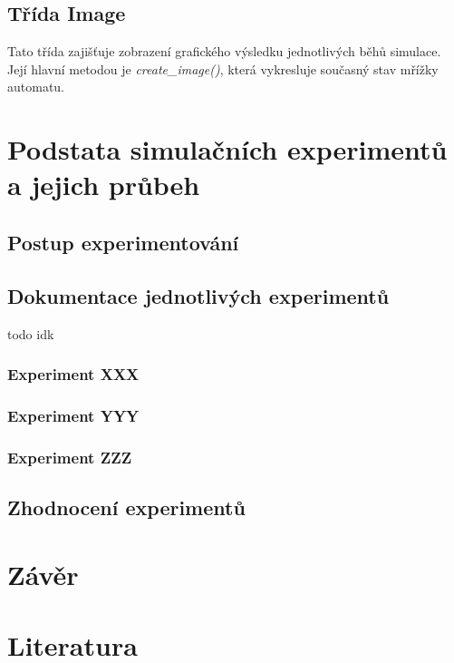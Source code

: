 \documentclass[a4paper,11pt]{article}
\begin{document}
\subsection{Třída Image}
Tato třída zajišťuje zobrazení grafického výsledku jednotlivých běhů simulace. Její hlavní metodou je \emph{create\_image()}, která vykresluje současný stav mřížky automatu.


\section{Podstata simulačních experimentů a jejich průbeh}
\subsection{Postup experimentování}
\subsection{Dokumentace jednotlivých experimentů}
todo idk
\subsubsection{Experiment XXX}
\subsubsection{Experiment YYY}
\subsubsection{Experiment ZZZ}
\subsection{Zhodnocení experimentů}

\section{Závěr}


\section{Literatura}


\newpage

\renewcommand{\refname}{\section{Literatura}}

\end{document}
